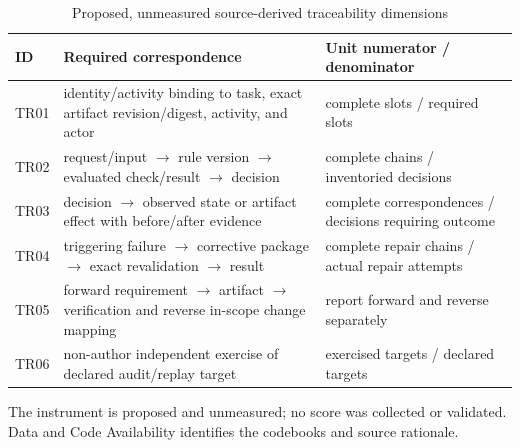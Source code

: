 \documentclass[journal]{IEEEtran}
\begin{document}
\begin{table}[t]
\caption{Proposed, unmeasured source-derived traceability dimensions}
\label{tab:traceability-rubric}
\centering
\footnotesize
\setlength{\tabcolsep}{4pt}
\begin{tabularx}{\columnwidth}{@{}l>{\raggedright\arraybackslash}X>{\raggedright\arraybackslash}p{}@{}}
\toprule
\textbf{ID} & \textbf{Required correspondence} & \textbf{Unit numerator / denominator} \\
\midrule
TR01 & identity/activity binding to task, exact artifact revision/digest, activity, and actor & complete slots / required slots \\
TR02 & request/input $\rightarrow$ rule version $\rightarrow$ evaluated check/result $\rightarrow$ decision & complete chains / inventoried decisions \\
TR03 & decision $\rightarrow$ observed state or artifact effect with before/after evidence & complete correspondences / decisions requiring outcome \\
TR04 & triggering failure $\rightarrow$ corrective package $\rightarrow$ exact revalidation $\rightarrow$ result & complete repair chains / actual repair attempts \\
TR05 & forward requirement $\rightarrow$ artifact $\rightarrow$ verification and reverse in-scope change mapping & report forward and reverse separately \\
TR06 & non-author independent exercise of declared audit/replay target & exercised targets / declared targets \\
\bottomrule
\end{tabularx}
\par\vspace{2pt}\noindent\parbox{0.96\columnwidth}{\footnotesize The instrument is proposed and unmeasured; no score was collected or validated. Data and Code Availability identifies the codebooks and source rationale.}
\end{table}
\end{document}

